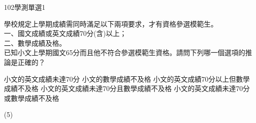    \begin{QUESTION}
        \begin{ExamInfo}{102}{學測}{單選}{1}
        \end{ExamInfo}
        \begin{ExamAnsRateInfo}{70}{88}{73}{49}
        \end{ExamAnsRateInfo}
        \begin{QBODY}
            學校規定上學期成績需同時滿足以下兩項要求，才有資格參選模範生。\\
				一、國文成績或英文成績70分(含)以上；\\
				二、數學成績及格。\\
				已知小文上學期國文65分而且他不符合參選模範生資格。請問下列哪一個選項的推論是正確的？
				\begin{QOPS}
					\QOP 小文的英文成績未達70分
					\QOP 小文的數學成績不及格
					\QOP 小文的英文成績70分以上但數學成績不及格
					\QOP 小文的英文成績未達70分且數學成績不及格
					\QOP 小文的英文成績未達70分或數學成績不及格
				\end{QOPS}
        \end{QBODY}
        \begin{QFROMS}
        \end{QFROMS}
        \begin{QTAGS}\end{QTAGS}
        \begin{QANS}
            (5)
        \end{QANS}
        \begin{QSOLLIST}
        \end{QSOLLIST}
        \begin{QEMPTYSPACE}
        \end{QEMPTYSPACE}
    \end{QUESTION}
